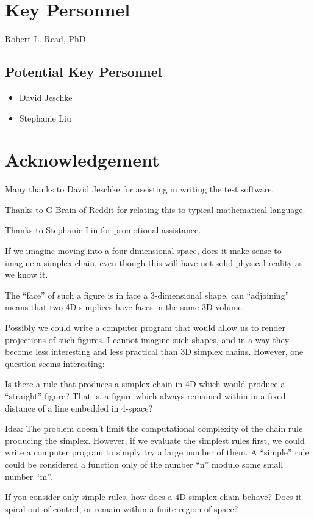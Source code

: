 \documentclass[11pt]{article}
\begin{document}
\section{Key Personnel}

Robert L. Read, PhD

\subsection{Potential Key Personnel}

\begin{itemize}
\item David Jeschke
  \item Stephanie Liu
\end{itemize}





\section{Acknowledgement}

Many thanks to David Jeschke for assisting in writing the test software.

Thanks to G-Brain of Reddit for relating this to typical mathematical language.

Thanks to Stephanie Liu for promotional assistance.


If we imagine moving into a four dimensional space, does it make sense to imagine a simplex chain, even though this will have
not solid physical reality as we know it.

The ``face'' of such a figure is in face a 3-dimensional shape, can ``adjoining'' means that two 4D simplices have faces in the same 3D volume.

Possibly we could write a computer program that would allow us to render projections of such figures.
I cannot imagine such shapes, and in a way they become less interesting and less practical than 3D simplex chains.
However, one question seems interesting:

Is there a rule that produces a simplex chain in 4D which would produce a ``straight'' figure?
That is, a figure which always remained within in a fixed distance of a line embedded in 4-space?

Idea: The problem doesn't limit the computational complexity of the chain rule producing the simplex.
However, if we evaluate the simplest rules first, we could write a computer program to simply try a large number
of them. A ``simple'' rule could be considered a function only of the number ``n'' modulo some small number ``m''.

If you consider only simple rules, how does a 4D simplex chain behave? Does it spiral out of control, or remain within
a finite region of space? 
\end{document}
